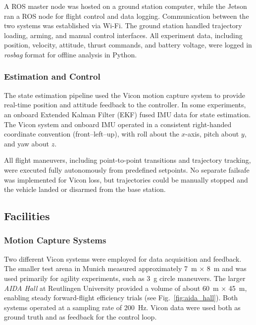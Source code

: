 A ROS master node was hosted on a ground station computer, while the Jetson ran a ROS node for flight control and data logging. Communication between the two systems was established via Wi-Fi. The ground station handled trajectory loading, arming, and manual control interfaces. All experiment data, including position, velocity, attitude, thrust commands, and battery voltage, were logged in \textit{rosbag} format for offline analysis in Python.

\subsubsection{Estimation and Control}
The state estimation pipeline used the Vicon motion capture system to provide real-time position and attitude feedback to the controller. In some experiments, an onboard Extended Kalman Filter (EKF) fused IMU data for state estimation. The Vicon system and onboard IMU operated in a consistent right-handed coordinate convention (front–left–up), with roll about the $x$-axis, pitch about $y$, and yaw about $z$.

All flight maneuvers, including point-to-point transitions and trajectory tracking, were executed fully autonomously from predefined setpoints. No separate failsafe was implemented for Vicon loss, but trajectories could be manually stopped and the vehicle landed or disarmed from the base station.

\subsection{Facilities}

\subsubsection{Motion Capture Systems}
Two different Vicon systems were employed for data acquisition and feedback.  
The smaller test arena in Munich measured approximately \SI{7}{\meter} × \SI{8}{\meter} and was used primarily for agility experiments, such as \SI{3}{g} circle maneuvers.  
The larger \textit{AIDA Hall} at Reutlingen University provided a volume of about \SI{60}{\meter} × \SI{45}{\meter}, enabling steady forward-flight efficiency trials (see Fig.~\ref{fig:aida_hall}).  
Both systems operated at a sampling rate of \SI{200}{\hertz}.  
Vicon data were used both as ground truth and as feedback for the control loop.

